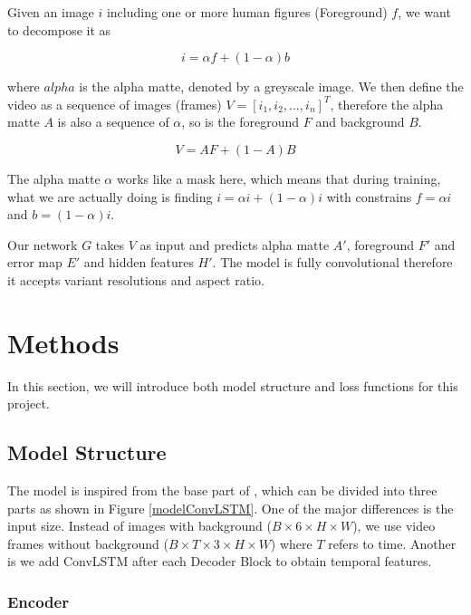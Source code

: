 \documentclass[final]{cvpr}
\begin{document}
Given an image $i$ including one or more human figures (Foreground) $f$, we want to decompose it as

\begin{equation}\label{formulationImage}
    i=\alpha f+(1-\alpha)b
\end{equation}

where $alpha$ is the alpha matte, denoted by a greyscale image.
We then define the video as a sequence of images (frames) $V=[i_1, i_2, \dots, i_n]^T$, therefore the alpha matte $A$ is also a sequence of $\alpha$, so is the foreground $F$ and background $B$.

\begin{equation}\label{formulationVideo}
    V=AF+(1-A)B
\end{equation}

The alpha matte $\alpha$ works like a mask here, which means that during training, what we are actually doing is finding $i=\alpha i+(1-\alpha)i$ with constrains $f=\alpha i$ and $b=(1-\alpha)i$.

Our network $G$ takes $V$ as input and predicts alpha matte $A'$, foreground $F'$ and error map $E'$ and hidden features $H'$.
The model is fully convolutional therefore it accepts variant resolutions and aspect ratio.

\section{Methods}

In this section, we will introduce both model structure and loss functions for this project.

\subsection{Model Structure}

The model is inspired from the base part of \cite{linRealTimeHighResolutionBackground2020a}, which can be divided into three parts as shown in Figure \ref{modelConvLSTM}.
One of the major differences is the input size.
Instead of images with background ($B\times 6\times H \times W$), we use video frames without background ($B\times T\times 3\times H \times W$) where $T$ refers to time.
Another is we add ConvLSTM after each Decoder Block to obtain temporal features.

\subsubsection{Encoder}
\end{document}

